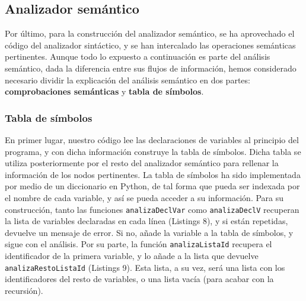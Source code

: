 \documentclass[11pt]{article}
\begin{document}
\subsection{Analizador semántico}
Por último, para la construcción del analizador semántico, se ha aprovechado el código del analizador sintáctico, y se han intercalado las operaciones semánticas pertinentes. Aunque todo lo expuesto a continuación es parte del análisis semántico, dada la diferencia entre sus flujos de información, hemos considerado necesario dividir la explicación del análisis semántico en dos partes: \textbf{comprobaciones semánticas} y \textbf{tabla de símbolos}.

\subsubsection{Tabla de símbolos}
En primer lugar, nuestro código lee las declaraciones de variables al principio del programa, y con dicha información construye la tabla de símbolos. Dicha tabla se utiliza posteriormente por el resto del analizador semántico para rellenar la información de los nodos pertinentes.
La tabla de símbolos ha sido implementada por medio de un diccionario en Python, de tal forma que pueda ser indexada por el nombre de cada variable, y así se pueda acceder a su información. Para su construcción, tanto las funciones \lstinline[language=Python]{analizaDeclVar} como \lstinline[language=Python]{analizaDeclV} recuperan la lista de variables declaradas en cada línea (Listings 8), y si están repetidas, devuelve un mensaje de error. Si no, añade la variable a la tabla de símbolos, y sigue con el análisis. Por su parte, la función \lstinline[language=Python]{analizaListaId} recupera el identificador de la primera variable, y lo añade a la lista que devuelve \lstinline[language=Python]{analizaRestoListaId} (Listings 9). Esta lista, a su vez, será una lista con los identificadores del resto de variables, o una lista vacía (para acabar con la recursión).
\end{document}
